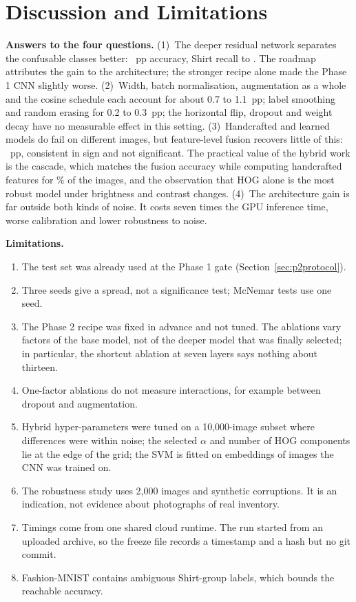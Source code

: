 \section{Discussion and Limitations}
\label{sec:p2discussion}
\textbf{Answers to the four questions.} (1)~The deeper residual network separates the confusable classes better:
\TestGainFinalVsPone{}~pp accuracy, Shirt recall \TestPoneShirt{} to \TestFinalShirt. The roadmap attributes the
gain to the architecture; the stronger recipe alone made the Phase 1 CNN slightly worse. (2)~Width, batch
normalisation, augmentation as a whole and the cosine schedule each account for about 0.7 to 1.1~pp; label
smoothing and random erasing for 0.2 to 0.3~pp; the horizontal flip, dropout and weight decay have no measurable
effect in this setting. (3)~Handcrafted and learned models do fail on different images, but feature-level fusion
recovers little of this: \HtwoGain{}~pp, consistent in sign and not significant. The practical value of the hybrid
work is the cascade, which matches the fusion accuracy while computing handcrafted features for \RoutedTest\% of
the images, and the observation that HOG alone is the most robust model under brightness and contrast changes.
(4)~The architecture gain is far outside both kinds of noise. It costs seven times the GPU inference time, worse
calibration and lower robustness to noise.

\textbf{Limitations.}
\begin{enumerate}
\item The test set was already used at the Phase 1 gate (Section~\ref{sec:p2protocol}).
\item Three seeds give a spread, not a significance test; McNemar tests use one seed.
\item The Phase 2 recipe was fixed in advance and not tuned. The ablations vary factors of the base model, not of
the deeper model that was finally selected; in particular, the shortcut ablation at seven layers says nothing about
thirteen.
\item One-factor ablations do not measure interactions, for example between dropout and augmentation.
\item Hybrid hyper-parameters were tuned on a 10{,}000-image subset where differences were within noise; the
selected $\alpha$ and number of HOG components lie at the edge of the grid; the SVM is fitted on embeddings of
images the CNN was trained on.
\item The robustness study uses 2{,}000 images and synthetic corruptions. It is an indication, not evidence about
photographs of real inventory.
\item Timings come from one shared cloud runtime. The run started from an uploaded archive, so the freeze file
records a timestamp and a hash but no git commit.
\item Fashion-MNIST contains ambiguous Shirt-group labels, which bounds the reachable accuracy.
\end{enumerate}

